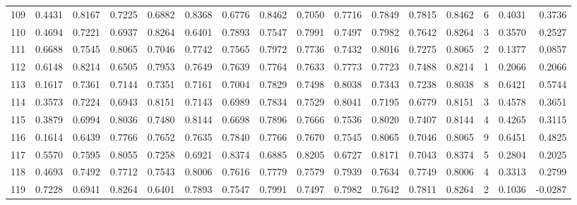 \begin{tabular}{lrrrrrrrrrrrrrrr}
109 &      0.4431 &  0.8167 &  0.7225 &  0.6882 &  0.8368 &  0.6776 &  0.8462 &  0.7050 &  0.7716 &  0.7849 &   0.7815 &     0.8462 &      6 &                    0.4031 &                     0.3736 \\
110 &      0.4694 &  0.7221 &  0.6937 &  0.8264 &  0.6401 &  0.7893 &  0.7547 &  0.7991 &  0.7497 &  0.7982 &   0.7642 &     0.8264 &      3 &                    0.3570 &                     0.2527 \\
111 &      0.6688 &  0.7545 &  0.8065 &  0.7046 &  0.7742 &  0.7565 &  0.7972 &  0.7736 &  0.7432 &  0.8016 &   0.7275 &     0.8065 &      2 &                    0.1377 &                     0.0857 \\
112 &      0.6148 &  0.8214 &  0.6505 &  0.7953 &  0.7649 &  0.7639 &  0.7764 &  0.7633 &  0.7773 &  0.7723 &   0.7488 &     0.8214 &      1 &                    0.2066 &                     0.2066 \\
113 &      0.1617 &  0.7361 &  0.7144 &  0.7351 &  0.7161 &  0.7004 &  0.7829 &  0.7498 &  0.8038 &  0.7343 &   0.7238 &     0.8038 &      8 &                    0.6421 &                     0.5744 \\
114 &      0.3573 &  0.7224 &  0.6943 &  0.8151 &  0.7143 &  0.6989 &  0.7834 &  0.7529 &  0.8041 &  0.7195 &   0.6779 &     0.8151 &      3 &                    0.4578 &                     0.3651 \\
115 &      0.3879 &  0.6994 &  0.8036 &  0.7480 &  0.8144 &  0.6698 &  0.7896 &  0.7666 &  0.7536 &  0.8020 &   0.7407 &     0.8144 &      4 &                    0.4265 &                     0.3115 \\
116 &      0.1614 &  0.6439 &  0.7766 &  0.7652 &  0.7635 &  0.7840 &  0.7766 &  0.7670 &  0.7545 &  0.8065 &   0.7046 &     0.8065 &      9 &                    0.6451 &                     0.4825 \\
117 &      0.5570 &  0.7595 &  0.8055 &  0.7258 &  0.6921 &  0.8374 &  0.6885 &  0.8205 &  0.6727 &  0.8171 &   0.7043 &     0.8374 &      5 &                    0.2804 &                     0.2025 \\
118 &      0.4693 &  0.7492 &  0.7712 &  0.7543 &  0.8006 &  0.7616 &  0.7779 &  0.7579 &  0.7939 &  0.7634 &   0.7749 &     0.8006 &      4 &                    0.3313 &                     0.2799 \\
119 &      0.7228 &  0.6941 &  0.8264 &  0.6401 &  0.7893 &  0.7547 &  0.7991 &  0.7497 &  0.7982 &  0.7642 &   0.7811 &     0.8264 &      2 &                    0.1036 &                    -0.0287 \\

\end{tabular}
